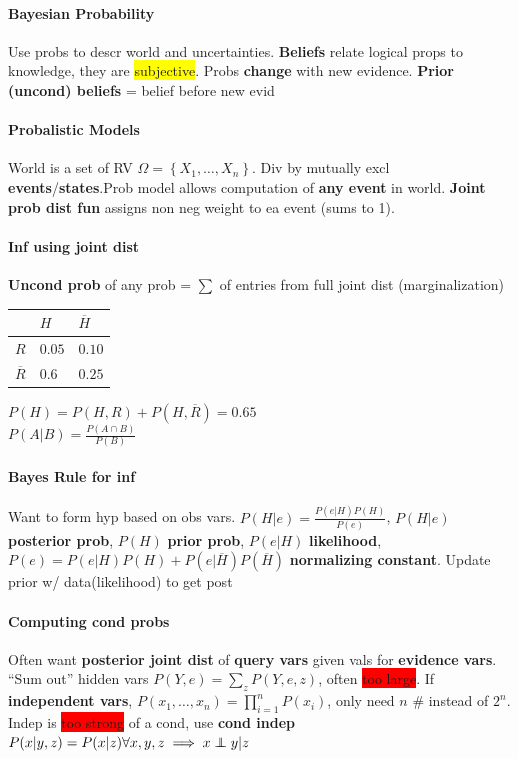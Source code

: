 \paragraph{Bayesian Probability} Use probs to descr world and
uncertainties. \textbf{Beliefs} relate logical props to knowledge,
they are \colorbox{yellow}{subjective}. Probs \textbf{change}
with new evidence. \textbf{Prior (uncond) beliefs} = belief before new
evid
\paragraph{Probalistic Models} World is a set of RV $\Omega =
\left\{X_1, \ldots, X_n\right\}$. Div by mutually excl
\textbf{events}/\textbf{states}.Prob model allows computation of
\textbf{any event} in world. \textbf{Joint prob dist fun} assigns non
neg weight to ea event (sums to 1).
\paragraph{Inf using joint dist} \textbf{Uncond prob} of any prob =
$\sum$ of entries from full joint dist (marginalization)
\begin{tabular}{lll}
  &$H$&$\overline{H}$
  \\ \hline $R$ & $0.05$ & $0.10$
  \\ $\overline{R}$ & $0.6$ & $0.25$
\end{tabular} $P(H)=P(H,R)+P(H,\overline{R})=0.65$
\\ $P(A|B)=\frac{P(A\cap B)}{P(B)}$
\paragraph{Bayes Rule for inf} Want to form hyp based on obs
vars. $P(H|e)=\frac{P(e|H)P(H)}{P(e)}$, $P(H|e)$ \textbf{posterior
  prob}, $P(H)$ \textbf{prior prob}, $P(e|H)$
\textbf{likelihood},
$P(e)=P(e|H)P(H)+P(e|\overline{H})P(\overline{H})$ \textbf{normalizing
  constant}. Update prior w/ data(likelihood) to get post
\paragraph{Computing cond probs} Often want \textbf{posterior joint
  dist} of \textbf{query vars} given vals for \textbf{evidence
  vars}. ``Sum out'' hidden vars $P(Y,e) = \sum_z P(Y,e,z)$, often
\colorbox{red}{too large}. If \textbf{independent vars},
$P(x_1,\ldots,x_n) = \prod_{i=1}^{n} P(x_i)$, only need $n$ \# instead
of $2^n$. Indep is \colorbox{red}{too strong} of a cond, use \textbf{cond indep}
$P(x|y,z)=P(x|z)\forall x,y,z \implies x \independent y | z$
